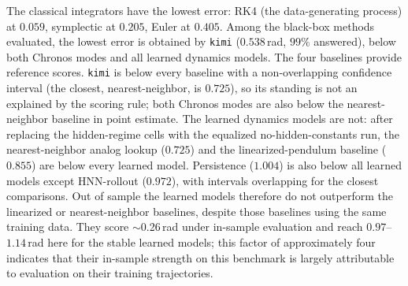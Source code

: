 \documentclass{article}
\begin{document}
The classical integrators have the lowest error: RK4 (the data-generating process) at
$0.059$, symplectic at $0.205$, Euler at $0.405$. Among the black-box
methods evaluated, the lowest error is obtained by \texttt{kimi} ($0.538$\,rad, $99\%$
answered), below both Chronos modes and all learned dynamics models. The four baselines
provide reference scores. \texttt{kimi} is below every baseline with a non-overlapping
confidence interval (the closest, nearest-neighbor, is $0.725$), so its standing is not an
explained by the scoring rule; both Chronos modes are also below the nearest-neighbor baseline in point
estimate. The learned dynamics models are not: after replacing the hidden-regime cells with
the equalized no-hidden-constants run, the nearest-neighbor analog lookup ($0.725$) and the
linearized-pendulum baseline ($0.855$) are below every learned model. Persistence ($1.004$)
is also below all learned models except HNN-rollout ($0.972$), with intervals overlapping for
the closest comparisons. Out of sample the learned models therefore do not outperform the
linearized or nearest-neighbor baselines, despite those baselines using the same training data. They score
$\sim$0.26\,rad under in-sample evaluation and reach $0.97$--$1.14$\,rad here for the stable
learned models; this factor of approximately four indicates that their in-sample strength on
this benchmark is largely attributable to evaluation on their training trajectories.
\end{document}
